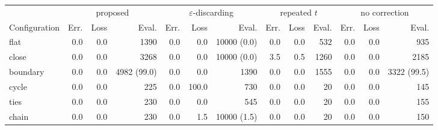 \setlength{\tabcolsep}{3pt}
\begin{tabular}{l*{4}{rrr}}
\toprule
 & \multicolumn{3}{c}{proposed} & \multicolumn{3}{c}{$\varepsilon$-discarding} & \multicolumn{3}{c}{repeated $t$} & \multicolumn{3}{c}{no correction} \\
\cmidrule(lr){2-4}\cmidrule(lr){5-7}\cmidrule(lr){8-10}\cmidrule(lr){11-13}
Configuration & Err. & Loss & Eval. & Err. & Loss & Eval. & Err. & Loss & Eval. & Err. & Loss & Eval. \\
\midrule
flat & 0.0 & 0.0 & 1390 & 0.0 & 0.0 & 10000 (0.0) & 0.0 & 0.0 & 532 & 0.0 & 0.0 & 935 \\
close & 0.0 & 0.0 & 3268 & 0.0 & 0.0 & 10000 (0.0) & 3.5 & 0.5 & 1260 & 0.0 & 0.0 & 2185 \\
boundary & 0.0 & 0.0 & 4982 (99.0) & 0.0 & 0.0 & 1390 & 0.0 & 0.0 & 1555 & 0.0 & 0.0 & 3322 (99.5) \\
cycle & 0.0 & 0.0 & 225 & 0.0 & 100.0 & 730 & 0.0 & 0.0 & 20 & 0.0 & 0.0 & 145 \\
ties & 0.0 & 0.0 & 230 & 0.0 & 0.0 & 545 & 0.0 & 0.0 & 20 & 0.0 & 0.0 & 155 \\
chain & 0.0 & 0.0 & 230 & 0.0 & 1.5 & 10000 (1.5) & 0.0 & 0.0 & 20 & 0.0 & 0.0 & 150 \\
\bottomrule
\end{tabular}
